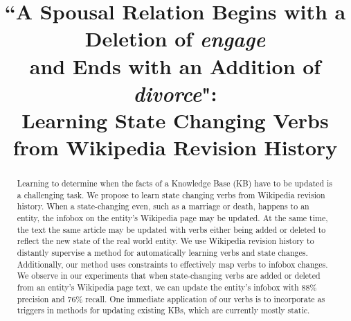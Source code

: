 \documentclass[11pt,a4paper]{article}
\title{``A Spousal Relation Begins with a Deletion of \textit{engage} \\and Ends with an Addition of \textit{divorce}": \\
Learning State Changing Verbs from Wikipedia Revision History}
\author{%
  }
\date{}
\begin{document}
\maketitle


\begin{abstract}


Learning to determine when the facts of a Knowledge Base (KB) have to be updated is a challenging task.
We propose to learn state changing verbs from Wikipedia revision history. When a state-changing even,  such as a marriage or death,  happens to an entity, the  infobox on the entity's Wikipedia page may be updated. At the same time, the text the same article may be updated with verbs either being added or deleted to reflect the new state of the real world entity. We use Wikipedia revision history %
to distantly supervise a method for automatically learning verbs and state changes. Additionally, our method uses %
constraints
  to effectively map verbs to infobox changes. We observe in our experiments that when state-changing verbs are  added or deleted from an entity's Wikipedia  page text, we can update the entity's infobox with 88\% precision and 76\% recall.
One immediate  application of our verbs is to incorporate as triggers in methods for   updating existing KBs, which are currently mostly static.

\end{abstract}








\end{document}
